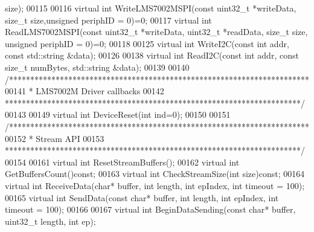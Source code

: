 \begin{DoxyCode}
      size);
00115 
00116     \textcolor{keyword}{virtual} \textcolor{keywordtype}{int} WriteLMS7002MSPI(\textcolor{keyword}{const} uint32\_t *writeData, \textcolor{keywordtype}{size\_t} size,\textcolor{keywordtype}{unsigned} periphID = 0)=0;
00117     \textcolor{keyword}{virtual} \textcolor{keywordtype}{int} ReadLMS7002MSPI(\textcolor{keyword}{const} uint32\_t *writeData, uint32\_t *readData, \textcolor{keywordtype}{size\_t} size, \textcolor{keywordtype}{unsigned} 
      periphID = 0)=0;
00118 
00125     \textcolor{keyword}{virtual} \textcolor{keywordtype}{int} WriteI2C(\textcolor{keyword}{const} \textcolor{keywordtype}{int} addr, \textcolor{keyword}{const} std::string &data);
00126 
00138     \textcolor{keyword}{virtual} \textcolor{keywordtype}{int} ReadI2C(\textcolor{keyword}{const} \textcolor{keywordtype}{int} addr, \textcolor{keyword}{const} \textcolor{keywordtype}{size\_t} numBytes, std::string &data);
00139 
00140     \textcolor{comment}{/***********************************************************************}
00141 \textcolor{comment}{     * LMS7002M Driver callbacks}
00142 \textcolor{comment}{     **********************************************************************/}
00143 
00149     \textcolor{keyword}{virtual} \textcolor{keywordtype}{int} DeviceReset(\textcolor{keywordtype}{int} ind=0);
00150 
00151     \textcolor{comment}{/***********************************************************************}
00152 \textcolor{comment}{     * Stream API}
00153 \textcolor{comment}{     **********************************************************************/}
00154 
00161     \textcolor{keyword}{virtual} \textcolor{keywordtype}{int} ResetStreamBuffers();
00162     \textcolor{keyword}{virtual} \textcolor{keywordtype}{int} GetBuffersCount()\textcolor{keyword}{const};
00163     \textcolor{keyword}{virtual} \textcolor{keywordtype}{int} CheckStreamSize(\textcolor{keywordtype}{int} size)\textcolor{keyword}{const};
00164     \textcolor{keyword}{virtual} \textcolor{keywordtype}{int} ReceiveData(\textcolor{keywordtype}{char}* buffer, \textcolor{keywordtype}{int} length, \textcolor{keywordtype}{int} epIndex, \textcolor{keywordtype}{int} timeout = 100);
00165     \textcolor{keyword}{virtual} \textcolor{keywordtype}{int} SendData(\textcolor{keyword}{const} \textcolor{keywordtype}{char}* buffer, \textcolor{keywordtype}{int} length, \textcolor{keywordtype}{int} epIndex, \textcolor{keywordtype}{int} timeout = 100);
00166     
00167     \textcolor{keyword}{virtual} \textcolor{keywordtype}{int} BeginDataSending(\textcolor{keyword}{const} \textcolor{keywordtype}{char}* buffer, uint32\_t length, \textcolor{keywordtype}{int} ep);

\end{DoxyCode}

